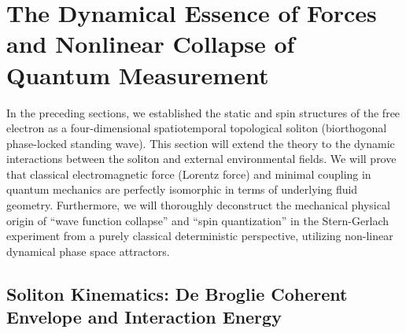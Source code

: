\documentclass[12pt, a4paper]{article}
\begin{document}
\section{The Dynamical Essence of Forces and Nonlinear Collapse of Quantum Measurement}

In the preceding sections, we established the static and spin structures of the free electron as a four-dimensional spatiotemporal topological soliton (biorthogonal phase-locked standing wave). This section will extend the theory to the dynamic interactions between the soliton and external environmental fields. We will prove that classical electromagnetic force (Lorentz force) and minimal coupling in quantum mechanics are perfectly isomorphic in terms of underlying fluid geometry. Furthermore, we will thoroughly deconstruct the mechanical physical origin of ``wave function collapse'' and ``spin quantization'' in the Stern-Gerlach experiment from a purely classical deterministic perspective, utilizing non-linear dynamical phase space attractors.

\subsection{Soliton Kinematics: De Broglie Coherent Envelope and Interaction Energy}
\end{document}
